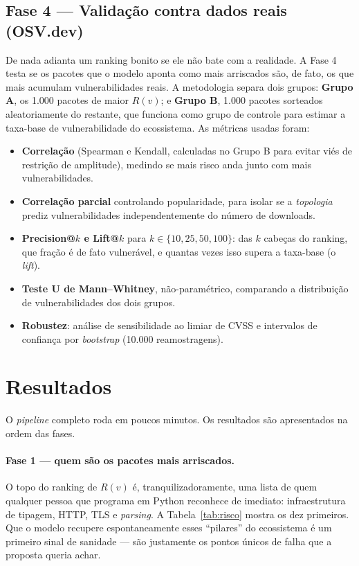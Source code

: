 \documentclass[11pt,a4paper]{article}
\begin{document}
\subsection{Fase 4 --- Validação contra dados reais (OSV.dev)}

De nada adianta um ranking bonito se ele não bate com a realidade. A Fase 4 testa se
os pacotes que o modelo aponta como mais arriscados são, de fato, os que mais
acumulam vulnerabilidades reais. A metodologia separa dois grupos:
\textbf{Grupo A}, os 1.000 pacotes de maior $R(v)$; e \textbf{Grupo B}, 1.000 pacotes
sorteados aleatoriamente do restante, que funciona como grupo de controle para
estimar a taxa-base de vulnerabilidade do ecossistema. As métricas usadas foram:

\begin{itemize}\setlength\itemsep{1pt}
  \item \textbf{Correlação} (Spearman e Kendall, calculadas no Grupo B para evitar
        viés de restrição de amplitude), medindo se mais risco anda junto com mais
        vulnerabilidades.
  \item \textbf{Correlação parcial} controlando popularidade, para isolar se a
        \emph{topologia} prediz vulnerabilidades independentemente do número de
        downloads.
  \item \textbf{Precision@$k$ e Lift@$k$} para $k\in\{10,25,50,100\}$: das $k$
        cabeças do ranking, que fração é de fato vulnerável, e quantas vezes isso
        supera a taxa-base (o \emph{lift}).
  \item \textbf{Teste U de Mann--Whitney}, não-paramétrico, comparando a distribuição
        de vulnerabilidades dos dois grupos.
  \item \textbf{Robustez}: análise de sensibilidade ao limiar de CVSS e intervalos
        de confiança por \emph{bootstrap} (10.000 reamostragens).
\end{itemize}

\section{Resultados}\label{sec:resultados}

O \emph{pipeline} completo roda em poucos minutos. Os resultados são apresentados na
ordem das fases.

\paragraph{Fase 1 --- quem são os pacotes mais arriscados.}
O topo do ranking de $R(v)$ é, tranquilizadoramente, uma lista de quem qualquer
pessoa que programa em Python reconhece de imediato: infraestrutura de tipagem, HTTP,
TLS e \emph{parsing}. A Tabela~\ref{tab:risco} mostra os dez primeiros. Que o modelo
recupere espontaneamente esses ``pilares'' do ecossistema é um primeiro sinal de
sanidade --- são justamente os pontos únicos de falha que a proposta queria achar.
\end{document}
